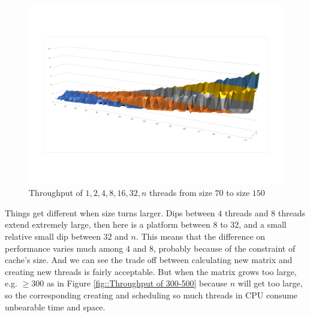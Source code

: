 \documentclass[12pt,a4paper]{article}
\begin{document}
\begin{figure}[H]
	\centering
	\includegraphics[scale= 0.6]{./fig/1_n_thread_73-140.pdf}
	\caption{Throughput of $1,2,4,8,16,32,n$ threads from size $70$ to size $150$}
	\label{fig::Throughput of 73-140}
\end{figure}

Things get different when size turns larger. Dips between $4$ threads and $8$ threads extend extremely large, then here is a platform between $8$ to $32$, and a small relative small dip between $32$ and $n$. This means that the difference on performance varies much among $4$ and $8$, probably because of the constraint of cache's size. And we can see the trade off between calculating new matrix and creating new threads is fairly acceptable. But when the matrix grows too large, e.g. $\geq300$ as in Figure \ref{fig::Throughput of 300-500}  because $n$ will get too large, so the corresponding creating and scheduling so much threads in CPU consume unbearable time and space.
\end{document}
